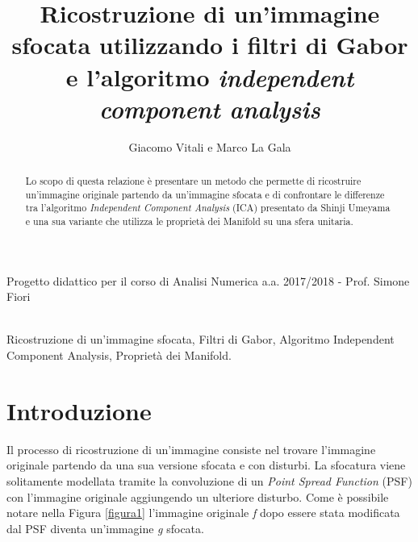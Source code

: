 \documentclass[final]{siamltex}
\begin{document}
\title{Ricostruzione di un'immagine sfocata utilizzando i filtri di Gabor e l'algoritmo \textit{independent component analysis}}
\author{Giacomo Vitali e Marco La Gala}
\maketitle
{\small Progetto didattico per il corso di Analisi Numerica a.a. 2017/2018 - Prof. Simone Fiori\\ 
\\} 
\renewcommand{\thefootnote}{\fnsymbol{footnote}}
\renewcommand{\thefootnote}{\arabic{footnote}}
\def\bbbr{{{\mathbb{R}}}}
\def\bbbs{{{\mathbb{S}}}}
\def\bbbm{{{\mathbb{M}}}}
\def\bbbd{{{\mathbb{D}}}}
\def\bbba{{{\mathbb{A}}}}
\def\bbbc{{{\mathbb{C}}}}
\def\bbbn{{{\mathbb{N}}}}
%
%
\begin{abstract}
Lo scopo di questa relazione \`{e} presentare un metodo che permette di ricostruire un'immagine originale partendo da un'immagine sfocata e di confrontare le differenze tra l'algoritmo \textit{Independent Component Analysis} (ICA) presentato da Shinji Umeyama \cite{Ume} e una sua variante che utilizza le propriet\`{a} dei Manifold su una sfera unitaria. 
\end{abstract}
%
%
%
\begin{keywords}
Ricostruzione di un'immagine sfocata, Filtri di Gabor, Algoritmo Independent Component Analysis, Propriet\`{a} dei Manifold.
\end{keywords}
%
%
%
\section{Introduzione}\label{sec1}
Il processo di ricostruzione di un'immagine consiste nel trovare l'immagine originale partendo da una sua versione sfocata e con disturbi. La sfocatura viene solitamente modellata tramite la convoluzione di un \textit{Point Spread Function} (PSF) con l'immagine originale aggiungendo un ulteriore disturbo. Come \`{e} possibile notare nella Figura \ref{figura1} l'immagine originale \textit{f} dopo essere stata modificata dal PSF diventa un'immagine \textit{g} sfocata.
\end{document}
